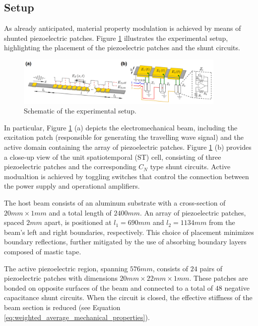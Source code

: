 \subsection{Setup}
\label{subsec:experimental_setup}

As already anticipated, material property modulation is achieved by means of shunted piezoelectric patches.
Figure \ref{fig:experimental_setup} illustrates the experimental setup, highlighting the placement of the piezoelectric patches and the shunt circuits.

\begin{figure}[H]
    \centering
    \includegraphics[width=0.9\textwidth]{./img/experimental_setup_scheme.png}
    \caption{Schematic of the experimental setup.}
    \label{fig:experimental_setup}
\end{figure}

In particular, Figure \ref{fig:experimental_setup} (a) depicts the electromechanical beam, including the excitation patch (responsible for generating the travelling wave signal) and the active domain containing the array of piezoelectric patches.
Figure \ref{fig:experimental_setup} (b) provides a close-up view of the unit spatiotemporal (ST) cell, consisting of three piezoelectric patches and the corresponding $C_N$ type shunt circuits.
Active modualtion is achieved by toggling switches that control the connection between the power supply and operational amplifiers.

The host beam consists of an aluminum substrate with a cross-section of $20 mm \times 1 mm$ and a total length of $2400 mm$.
An array of piezoelectric patches, spaced $2 mm$ apart, is positioned at $l_1 = 690 mm$ and $l_2 = 1134 mm$ from the beam's left and right boundaries, respectively.
This choice of placement minimizes boundary reflections, further mitigated by the use of absorbing boundary layers composed of mastic tape.

The active piezoelectric region, spanning $576 mm$, consists of $24$ pairs of piezoelectric patches with dimensions $20 mm \times 22 mm \times 1 mm$.
These patches are bonded on opposite surfaces of the beam and connected to a total of $48$ negative capacitance shunt circuits.
When the circuit is closed, the effective stiffness of the beam section is reduced (see Equation \ref{eq:weighted_average_mechanical_properties}).


